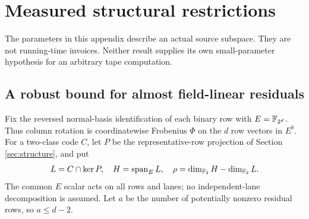 \section{Measured structural restrictions}\label{sec:structural-bounds}

The parameters in this appendix describe an actual source subspace.
They are not running-time invoices. Neither result supplies its own
small-parameter hypothesis for an arbitrary tape computation.

\subsection{A robust bound for almost field-linear residuals}

Fix the reversed normal-basis identification of each binary row with
$E=\mathbb{F}_{2^d}$. Thus column rotation is coordinatewise Frobenius $\Phi$ on
the $d$ row vectors in $E^b$. For a two-class code $C$, let $P$ be the
representative-row projection of Section \ref{sec:structure}, and put
\[
 L=C\cap\ker P,\quad H=\operatorname{span}_E L,\quad
 \rho=\dim_{\mathbb{F}_2}H-\dim_{\mathbb{F}_2}L.
\]
The common $E$ scalar acts on all rows and lanes; no independent-lane
decomposition is assumed. Let $a$ be the number of potentially nonzero
residual rows, so $a\le d-2$.

